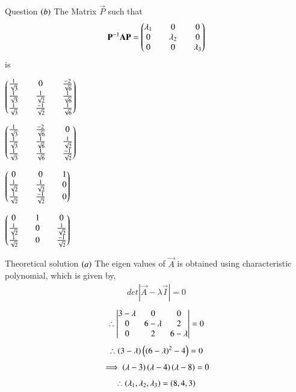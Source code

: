 \documentclass{beamer}
\begin{document}
\begin{frame}{Question}
$\left(b\right)$ The Matrix $\vec{P}$ such that
\begin{align*}
    \mathbf{P}^{-1}\mathbf{A}\mathbf{P}=\begin{pmatrix}\lambda_1&&0&&0\\0&&\lambda_2&&0\\0&&0&&\lambda_3\end{pmatrix}
\end{align*}
is

\begin{enumerate}
\begin{multicols}{2}
    \item $\begin{pmatrix}\frac{1}{\sqrt{3}}&&0&&\frac{-2}{\sqrt{6}}\\\frac{1}{\sqrt{3}}&&\frac{1}{\sqrt{2}}&&\frac{1}{\sqrt{6}}\\\frac{1}{\sqrt{3}}&&\frac{-1}{\sqrt{2}}&&\frac{1}{\sqrt{6}}\end{pmatrix}$
    \item $\begin{pmatrix}\frac{1}{\sqrt{3}}&&\frac{-2}{\sqrt{6}}&&0\\\frac{1}{\sqrt{3}}&&\frac{1}{\sqrt{6}}&&\frac{1}{\sqrt{2}}\\\frac{1}{\sqrt{3}}&&\frac{1}{\sqrt{6}}&&\frac{-1}{\sqrt{2}}\end{pmatrix}$
    \item $\begin{pmatrix}0&&0&&1\\\frac{1}{\sqrt{2}}&&\frac{1}{\sqrt{2}}&&0\\\frac{1}{\sqrt{2}}&&\frac{-1}{\sqrt{2}}&&0\end{pmatrix}$
    \item $\begin{pmatrix}0&&1&&0\\\frac{1}{\sqrt{2}}&&0&&\frac{1}{\sqrt{2}}\\\frac{1}{\sqrt{2}}&&0&&\frac{-1}{\sqrt{2}}\end{pmatrix}$
\end{multicols}
\end{enumerate}
\end{frame}
\begin{frame}{Theoretical solution}
$\left(a\right)$ The eigen values of $\vec{A}$ is obtained using characteristic polynomial, which is given by,
\begin{align}
    det|\vec{A}-\lambda\vec{I}|=0
\end{align}
\begin{align}
    \therefore \begin{vmatrix}3-\lambda&0&0\\0&6-\lambda&2\\0&2&6-\lambda\end{vmatrix}=0
\end{align}
\begin{align}
    \therefore \left(3-\lambda\right)\left(\left(6-\lambda\right)^2-4\right)=0
\end{align}
\begin{align}
    \implies  \left(\lambda-3\right)\left(\lambda-4\right)\left(\lambda-8\right)=0
\end{align}
\begin{align}
    \therefore \left(\lambda_1,\lambda_2,\lambda_3\right)=\left(8,4,3\right)
\end{align}
\end{frame}
\end{document}

